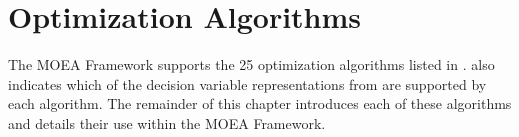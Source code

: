 %
%

\chapter{Optimization Algorithms}
\label{chpt:algorithms}

The MOEA Framework supports the 25 optimization algorithms listed in .   also indicates which of the decision variable representations from  are supported by each algorithm.  The remainder of this chapter introduces each of these algorithms and details their use within the MOEA Framework.


